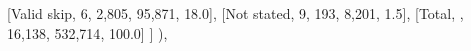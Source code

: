 \documentclass[
  11pt,
  a4paper,
]{article}
\newenvironment{Shaded}{\begin{snugshade}}{\end{snugshade}}
\newcommand{\NormalTok}[1]{\textcolor[rgb]{0.00,0.23,0.31}{#1}}
\newcommand{\StringTok}[1]{\textcolor[rgb]{0.13,0.47,0.30}{#1}}
\begin{document}
\begin{Shaded}
\begin{Highlighting}[]
\NormalTok{            [}\StringTok{\textquotesingle{}Valid skip\textquotesingle{}}\NormalTok{, }\StringTok{\textquotesingle{}6\textquotesingle{}}\NormalTok{, }\StringTok{\textquotesingle{}2,805\textquotesingle{}}\NormalTok{, }\StringTok{\textquotesingle{}95,871\textquotesingle{}}\NormalTok{, }\StringTok{\textquotesingle{}18.0\textquotesingle{}}\NormalTok{],}
\NormalTok{            [}\StringTok{\textquotesingle{}Not stated\textquotesingle{}}\NormalTok{, }\StringTok{\textquotesingle{}9\textquotesingle{}}\NormalTok{, }\StringTok{\textquotesingle{}193\textquotesingle{}}\NormalTok{, }\StringTok{\textquotesingle{}8,201\textquotesingle{}}\NormalTok{, }\StringTok{\textquotesingle{}1.5\textquotesingle{}}\NormalTok{],}
\NormalTok{            [}\StringTok{\textquotesingle{}Total\textquotesingle{}}\NormalTok{, }\StringTok{\textquotesingle{}\textquotesingle{}}\NormalTok{, }\StringTok{\textquotesingle{}16,138\textquotesingle{}}\NormalTok{, }\StringTok{\textquotesingle{}532,714\textquotesingle{}}\NormalTok{, }\StringTok{\textquotesingle{}100.0\textquotesingle{}}\NormalTok{]}
\NormalTok{        ]}
\NormalTok{    ),}


\end{Highlighting}
\end{Shaded}
\end{document}
